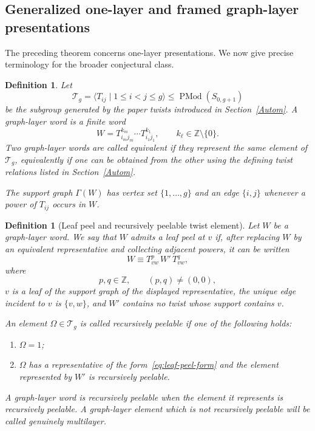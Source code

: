 \documentclass{article}
\newtheorem{df}[theorem]{Definition}
\begin{document}
\subsection{Generalized one-layer and framed graph-layer presentations}
\label{subsec:generalized-one-layer-definitions}

The preceding theorem concerns  one-layer presentations.  We now give
precise terminology for the broader conjectural class.

\begin{df}
Let
\[
 \mathcal T_g=\langle T_{ij}\mid 1\leq i<j\leq g\rangle
 \leq \operatorname{PMod}(S_{0,g+1})
\]
be the subgroup generated by the paper twists introduced in
Section~\ref{Autom}.  A \emph{graph-layer word} is a finite word
\[
 W=T_{i_mj_m}^{k_m}\cdots T_{i_1j_1}^{k_1},
 \qquad k_\ell\in\mathbb Z\setminus\{0\}.
\]
Two graph-layer words are called \emph{equivalent} if they represent the same
element of $\mathcal T_g$, equivalently if one can be obtained from the other
using the defining twist relations listed in Section~\ref{Autom}.

The \emph{support graph} $\Gamma(W)$ has vertex set $\{1,\ldots,g\}$ and an
edge $\{i,j\}$ whenever a power of $T_{ij}$ occurs in $W$.
\end{df}

\begin{df}[Leaf peel and recursively peelable twist element]
\label{def:recursively-peelable}
Let $W$ be a graph-layer word.  We say that $W$ \emph{admits a leaf peel at
$v$} if, after replacing $W$ by an equivalent representative and collecting
adjacent powers, it can be written
\begin{equation}
 W\equiv T_{vw}^{p}\,W'\,T_{vw}^{q},
 \label{eq:leaf-peel-form}
\end{equation}
where
\[
 p,q\in\mathbb Z,
 \qquad (p,q)\neq(0,0),
\]
$v$ is a leaf of the support graph of the displayed representative, the
unique edge incident to $v$ is $\{v,w\}$, and $W'$ contains no twist whose
support contains $v$.

An element $\Omega\in\mathcal T_g$ is called \emph{recursively peelable} if
one of the following holds:
\begin{enumerate}
\item $\Omega=1$;
\item $\Omega$ has a representative of the form~\eqref{eq:leaf-peel-form}
and the element represented by $W'$ is recursively peelable.
\end{enumerate}
A graph-layer word is recursively peelable when the element it represents is
recursively peelable.  A graph-layer element which is not recursively
peelable will be called \emph{genuinely multilayer}.
\end{df}
\end{document}
